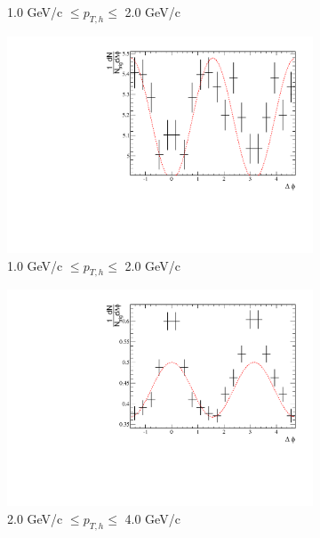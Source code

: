 \begin{figure}[htbp]
\begin{subfigure}{0.5\textwidth}
		\caption{1.0 GeV/c $\leq p_{T,h} \leq$ 2.0 GeV/c}
		\label{fig:EP_corr_raw_c}
	\end{subfigure}	
	\begin{subfigure}{0.5\textwidth}
		\includegraphics[width=.9\textwidth]{Plots/Correlations/EP/raw/NPE_eh_corr_raw_outofplane_primpt_4_5_cent_2_5_assopt_2_2.pdf}
		\caption{1.0 GeV/c $\leq p_{T,h} \leq$ 2.0 GeV/c}
		\label{fig:EP_corr_raw_d}
	\end{subfigure}	
	\begin{subfigure}{0.5\textwidth}
		\includegraphics[width=.9\textwidth]{Plots/Correlations/EP/raw/NPE_eh_corr_raw_inplane_primpt_4_5_cent_2_5_assopt_3_4.pdf}
		\caption{2.0 GeV/c $\leq p_{T,h} \leq$ 4.0 GeV/c}
		\label{fig:EP_corr_raw_e}
	\end{subfigure}	
	\begin{subfigure}{0.5\textwidth}

\end{subfigure}
\end{figure}
